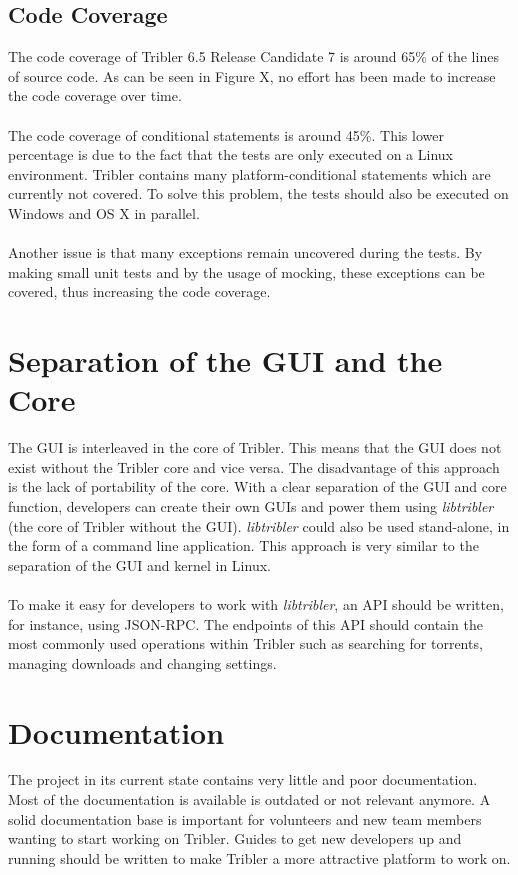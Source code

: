 \subsection{Code Coverage}
The code coverage of Tribler 6.5 Release Candidate 7 is around 65\% of the lines of source code. As can be seen in Figure X, no effort has been made to increase the code coverage over time.\\\\
The code coverage of conditional statements is around 45\%. This lower percentage is due to the fact that the tests are only executed on a Linux environment. Tribler contains many platform-conditional statements which are currently not covered. To solve this problem, the tests should also be executed on Windows and OS X in parallel.\\\\
Another issue is that many exceptions remain uncovered during the tests. By making small unit tests and by the usage of mocking, these exceptions can be covered, thus increasing the code coverage.

\section{Separation of the GUI and the Core}
The GUI is interleaved in the core of Tribler. This means that the GUI does not exist without the Tribler core and vice versa. The disadvantage of this approach is the lack of portability of the core. With a clear separation of the GUI and core function, developers can create their own GUIs and power them using \emph{libtribler} (the core of Tribler without the GUI). \emph{libtribler} could also be used stand-alone, in the form of a command line application. This approach is very similar to the separation of the GUI and kernel in Linux.\\\\
To make it easy for developers to work with \emph{libtribler}, an API should be written, for instance, using JSON-RPC. The endpoints of this API should contain the most commonly used operations within Tribler such as searching for torrents, managing downloads and changing settings.

\section{Documentation}
The project in its current state contains very little and poor documentation. Most of the documentation is available is outdated or not relevant anymore. A solid documentation base is important for volunteers and new team members wanting to start working on Tribler. Guides to get new developers up and running should be written to make Tribler a more attractive platform to work on.

